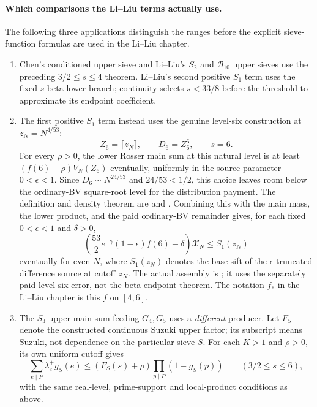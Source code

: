 \paragraph{Which comparisons the Li--Liu terms actually use.}
The following three applications distinguish the ranges before the explicit
sieve-function formulas are used in the Li--Liu chapter.
\begin{enumerate}
\item Chen's conditioned upper sieve and Li--Liu's $S_2$ and $\mathcal B_{10}$
upper sieves use the preceding $3/2\le s\le4$ theorem. Li--Liu's second
positive $S_1$ term uses the fixed-$s$ beta lower branch; continuity selects
$s<33/8$ before the threshold to approximate its endpoint coefficient.
\item The first positive $S_1$ term instead uses the genuine level-six
construction at $z_N=N^{4/53}$:
\[
 Z_6=\lceil z_N\rceil,\qquad D_6=Z_6^6,\qquad s=6.
\]
For every $\rho>0$, the lower Rosser main sum at this natural level is at
least $(f(6)-\rho)V_N(Z_6)$ eventually, uniformly in the source parameter
$0<\epsilon<1$. Since $D_6\sim N^{24/53}$ and $24/53<1/2$, this choice leaves room below
the ordinary-BV square-root level for the distribution payment.
The definition and density theorem are
and .
Combining this with the main mass, the lower product, and the paid ordinary-BV
remainder gives, for each fixed $0<\epsilon<1$ and $\delta>0$,
\[
 \left(\frac{53}{2}e^{-\gamma}(1-\epsilon)f(6)-\delta\right)\mathcal X_N
 \le S_1(z_N)
\]
eventually for even $N$, where $S_1(z_N)$ denotes the base sift of the
$\epsilon$-truncated difference source at cutoff $z_N$.
The actual assembly is
;
it uses the separately paid level-six error, not the beta endpoint theorem.
The notation $f_*$ in the Li--Liu chapter is this $f$ on $[4,6]$.
\item The $S_3$ upper main sum feeding $G_4,G_5$ uses a \emph{different}
producer. Let $F_S$ denote the constructed continuous Suzuki upper factor;
its subscript means Suzuki, not dependence on the particular sieve $S$.
For each $K>1$ and $\rho>0$, its own uniform cutoff gives
\[
 \sum_{e\mid P}\lambda_e^+g_S(e)
 \le (F_S(s)+\rho)\prod_{p\mid P}(1-g_S(p))
 \qquad(3/2\le s\le6),
\]
with the same real-level, prime-support and local-product conditions as above.

\end{enumerate}
